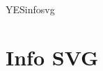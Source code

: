 %

\ifx \HTML\UnDef
   \def\HTML{infosvg}
   \def\CONFIG{\jobname}
   \def\MAKETITLE{\author{Eitan M. Gurari}}
   \def\next{   \endinput}
   \expandafter\next
\fi



\expandafter\ifx \csname YES\HTML\endcsname\relax
\else
    \def\<{\edef\FIRST{\the\inputlineno}\let\<\saveCd \saveCd}
    \def\CleanComment#1tex4ht-info-svg#2#3#4.#5>#6//{[#4%
                  \if,\ifnum \FIRST=#6 .\else ,0\fi\fi]#6//}
\fi






\chapter{Info SVG}


